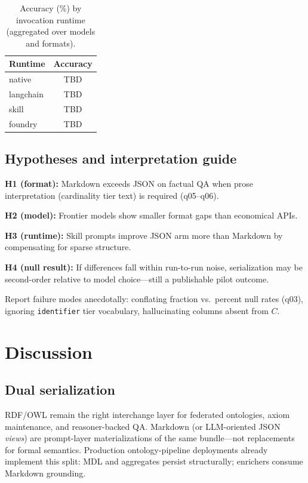 \documentclass[11pt,a4paper]{article}
\begin{document}
\begin{table}[t]
  \centering
  \caption{Accuracy (\%) by invocation runtime (aggregated over models and formats).}
  \label{tab:runtime}
  \begin{tabular}{@{}lc@{}}
    \toprule
    Runtime & Accuracy \\
    \midrule
    native    & TBD \\
    langchain & TBD \\
    skill     & TBD \\
    foundry   & TBD \\
    \bottomrule
  \end{tabular}
\end{table}


\subsection{Hypotheses and interpretation guide}
\textbf{H1 (format):} Markdown exceeds JSON on factual QA when prose interpretation (cardinality tier text) is required (q05--q06).

\textbf{H2 (model):} Frontier models show smaller format gaps than economical APIs.

\textbf{H3 (runtime):} Skill prompts improve JSON arm more than Markdown by compensating for sparse structure.

\textbf{H4 (null result):} If differences fall within run-to-run noise, serialization may be second-order relative to model choice---still a publishable pilot outcome.

Report failure modes anecdotally: conflating fraction vs.\ percent null rates (q03), ignoring \texttt{identifier} tier vocabulary, hallucinating columns absent from $C$.

\section{Discussion}
\label{sec:discussion}

\subsection{Dual serialization}
RDF/OWL remain the right interchange layer for federated ontologies, axiom maintenance, and reasoner-backed QA.
Markdown (or LLM-oriented JSON \emph{views}) are prompt-layer materializations of the same bundle---not replacements for formal semantics.
Production ontology-pipeline deployments already implement this split: MDL and aggregates persist structurally; enrichers consume Markdown grounding.
\end{document}
